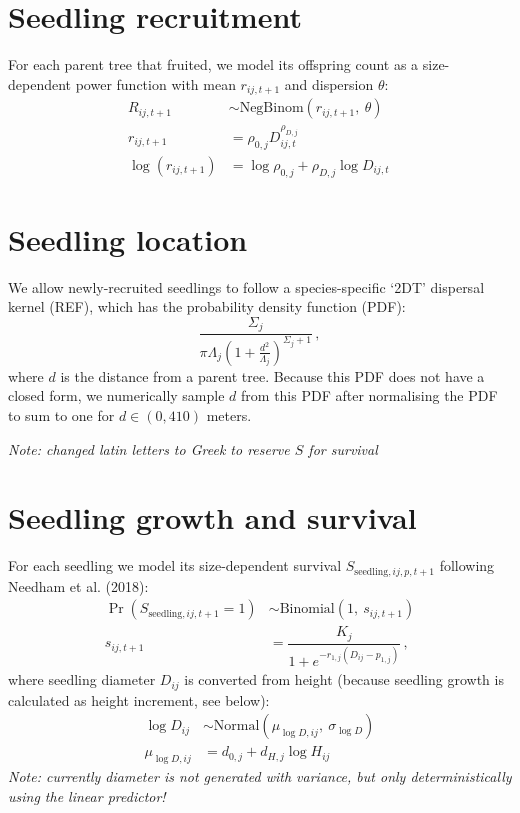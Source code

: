 \documentclass[12pt,a4paper]{article}
\begin{document}
\section{Seedling recruitment}
For each parent tree that fruited, we model its offspring count as a size-dependent power function with mean $r_{ij,t+1}$ and dispersion $\theta$:
\begin{align}
R_{ij,t+1} &\sim \text{NegBinom}\left(r_{ij,t+1},~\theta\right) \\
r_{ij,t+1} &=  \rho_{0,j} D_{ij,t}^{\rho_{D,j}} \label{eq:fruit} \\
\log\left(r_{ij,t+1}\right) &=  \log \rho_{0,j} + \rho_{D,j} \log D_{ij,t} \,
\end{align}

\section{Seedling location}
We allow newly-recruited seedlings to follow a species-specific `2DT' dispersal kernel (REF), which has the probability density function (PDF):
\begin{equation}
\frac{\Sigma_j}{\pi \Lambda_j \left(1 + \frac{d^2}{\Lambda_j}\right)^{\Sigma_j+1}} \,,
\end{equation}
where $d$ is the distance from a parent tree. Because this PDF does not have a closed form, we numerically sample $d$ from this PDF after normalising the PDF to sum to one for $d \in (0, 410)$ meters.

\textit{Note: changed latin letters to Greek to reserve $S$ for survival}

\section{Seedling growth and survival}
For each seedling we model its size-dependent survival $S_{\text{seedling},ij,p,t+1}$ following Needham et al. (2018):
\begin{align}
\Pr(S_{\text{seedling},ij,t+1} = 1) &\sim \text{Binomial}(1,~s_{ij,t+1}) \\
s_{ij,t+1} &= \dfrac{K_j}{1 + e^{-r_{1,j}  (D_{ij} - p_{1,j})}} \,, 
\end{align}
where seedling diameter $D_{ij}$ is converted from height (because seedling growth is calculated as height increment, see below):
\begin{align}
\log D_{ij} &\sim \text{Normal}(\mu_{\log D,ij},~\sigma_{\log D}) \\
\mu_{\log D,ij} &= d_{0,j} + d_{H,j} \log H_{ij}
\end{align}
\textit{Note: currently diameter is not generated with variance, but only deterministically using the linear predictor!}
\end{document}
